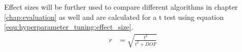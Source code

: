Effect sizes will be further used to compare different algorithms in chapter \ref{chap:evaluation} as well and are calculated for a t test using equation \ref{equ:hyperparameter_tuning:effect_size}.
\begin{equation} \label{equ:hyperparameter_tuning:effect_size}
	\begin{split}
		r & = \sqrt{\frac{t^2}{t^2 + DOF}}
	\end{split}
\end{equation}




